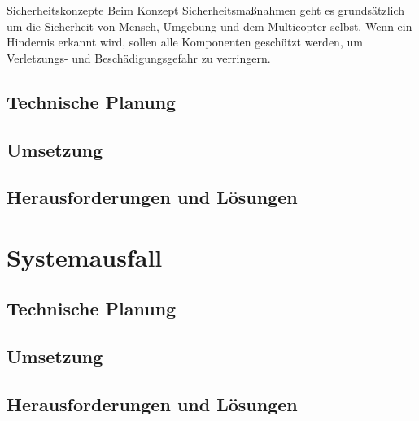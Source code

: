 Sicherheitskonzepte
Beim Konzept Sicherheitsmaßnahmen geht es grundsätzlich um die Sicherheit von Mensch, Umgebung und dem Multicopter selbst. Wenn ein Hindernis erkannt wird, sollen alle Komponenten geschützt werden, um Verletzungs- und Beschädigungsgefahr zu verringern. 

  \subsection{Technische Planung}

  \subsection{Umsetzung}

  \subsection{Herausforderungen und Lösungen}

\section{Systemausfall}

  \subsection{Technische Planung}

  \subsection{Umsetzung}

  \subsection{Herausforderungen und Lösungen}
